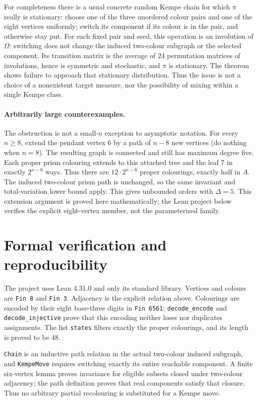 \documentclass[11pt]{article}
\begin{document}
For completeness there is a usual concrete random Kempe chain for which $\pi$ really is stationary: choose one of the three unordered colour pairs and one of the eight vertices uniformly; switch its component if its colour is in the pair, and otherwise stay put. For each fixed pair and seed, this operation is an involution of $\Omega$: switching does not change the induced two-colour subgraph or the selected component. Its transition matrix is the average of 24 permutation matrices of involutions, hence is symmetric and stochastic, and $\pi$ is stationary. The theorem shows failure to approach that stationary distribution. Thus the issue is not a choice of a nonexistent target measure, nor the possibility of mixing within a single Kempe class.

\paragraph{Arbitrarily large counterexamples.}
The obstruction is not a small-$n$ exception to asymptotic notation. For every $n\geq8$, extend the pendant vertex 6 by a path of $n-8$ new vertices (do nothing when $n=8$). The resulting graph is connected and still has maximum degree five. Each proper prism colouring extends to this attached tree and the leaf 7 in exactly $2^{n-6}$ ways. Thus there are $12\cdot2^{n-6}$ proper colourings, exactly half in $A$. The induced two-colour prism path is unchanged, so the same invariant and total-variation lower bound apply. This gives unbounded orders with $\Delta=5$. This extension argument is proved here mathematically; the Lean project below verifies the explicit eight-vertex member, not the parameterized family.

\section{Formal verification and reproducibility}
The project uses Lean 4.31.0 and only its standard library. Vertices and colours are \texttt{Fin 8} and \texttt{Fin 3}. Adjacency is the explicit relation above. Colourings are encoded by their eight base-three digits in \texttt{Fin 6561}; \texttt{decode\_encode} and \texttt{decode\_injective} prove that this encoding neither loses nor duplicates assignments. The list \texttt{states} filters exactly the proper colourings, and its length is proved to be 48.

\texttt{Chain} is an inductive path relation in the actual two-colour induced subgraph, and \texttt{KempeMove} requires switching exactly its entire reachable component. A finite six-vertex lemma proves invariance for eligible subsets closed under two-colour adjacency; the path definition proves that real components satisfy that closure. Thus no arbitrary partial recolouring is substituted for a Kempe move.
\end{document}
